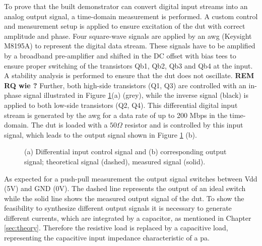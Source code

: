 \documentclass[journal]{IEEEtran}
\begin{document}
To prove that the built demonstrator can convert digital input streams into an analog output signal, a time-domain measurement is performed.
A custom control and measurement setup is applied to ensure excitation of the \gls{dut} with correct amplitude and phase.
Four square-wave signals are applied by an \gls{awg} (Keysight M8195A) to represent the digital data stream. 
These signals have to be amplified by a broadband pre-amplifier and shifted in the DC offset with bias tees to ensure proper switching of the transistors Qb1, Qb2, Qb3 and Qb4 at the input. A stability analysis is performed to ensure that the \gls{dut} does not oscillate. {\bf REM RQ wie ? }
Further, both high-side transistors (Q1, Q3) are controlled with an in-phase signal illustrated in Figure \ref{fig:meas_Input_Output_RLoad_100M_SmallSize_Paper}(a) (grey), while the inverse signal (black) is applied to both low-side transistors (Q2, Q4).
This differential digital input stream is generated by the \gls{awg} for a data rate of up to 200 Mbps in the time-domain.
The \gls{dut} is loaded with a $50 \Omega$ resistor and is controlled by this input signal, which leads to the output signal shown in Figure \ref{fig:meas_Input_Output_RLoad_100M_SmallSize_Paper} (b).
%
\begin{figure}[htb]
  \centering
	\begin{scriptsize}
  	\def\svgwidth{\columnwidth}
 	 
  	\caption{(a) Differential input control signal and (b) corresponding output signal; theoretical signal (dashed), measured signal (solid).}
  	\label{fig:meas_Input_Output_RLoad_100M_SmallSize_Paper}
	\end{scriptsize}
\end{figure}
%
As expected for a push-pull measurement the output signal switches between Vdd (5V) and GND (0V).
The dashed line represents the output of an ideal switch while the solid line shows the measured output signal of the \gls{dut}.
To show the feasibility to synthesize different output signals it is necessary to generate different currents, which are integrated by a capacitor, as mentioned in Chapter \ref{sec:theory}.
Therefore the resistive load is replaced by a capacitive load, representing the capacitive input impedance characteristic of a \gls{pa}.
\end{document}
